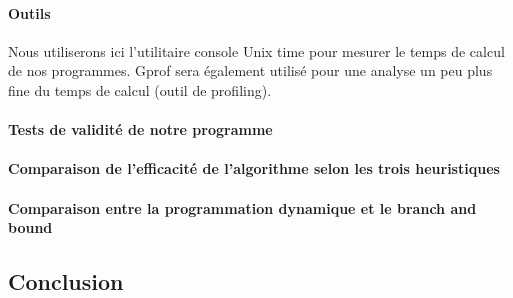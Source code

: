 \documentclass[a4paper, 12pt]{article}
\begin{document}
\paragraph{Outils}

Nous utiliserons ici l'utilitaire console Unix time pour mesurer le
temps de calcul de nos programmes. Gprof sera également utilisé pour
une analyse un peu plus fine du temps de calcul (outil de profiling).

\paragraph{Tests de validité de notre programme}

\paragraph{Comparaison de l'efficacité de l'algorithme selon les
  trois heuristiques}


\paragraph{Comparaison entre la programmation dynamique et le branch and bound}

\subsection{Conclusion}
\end{document}
